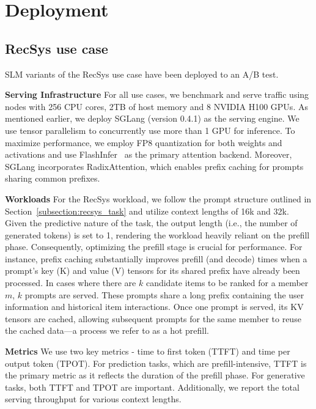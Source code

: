 \section{Deployment}
\label{section:deployment}

\subsection{RecSys use case}\label{section:recsys-deploy}
SLM variants of the RecSys use case have been deployed to an A/B test.

\noindent \textbf{Serving Infrastructure} For all use cases, we benchmark and serve traffic using nodes with 256 CPU cores, 2TB of host memory and 8 NVIDIA H100 GPUs. As mentioned earlier, we deploy SGLang (version 0.4.1) as the serving engine. We use tensor parallelism to concurrently use more than 1 GPU for inference. To maximize performance, we employ FP8 quantization for both weights and activations and use FlashInfer~\cite{ye2025flashinfer} as the primary attention backend. Moreover, SGLang incorporates RadixAttention, which enables prefix caching for prompts sharing common prefixes.

\noindent \textbf{Workloads} For the RecSys workload, we follow the prompt structure outlined in Section~\ref{subsection:recsys_task} and utilize context lengths of 16k and 32k. Given the predictive nature of the task, the output length (i.e., the number of generated tokens) is set to 1, rendering the workload heavily reliant on the prefill phase. Consequently, optimizing the prefill stage is crucial for performance. For instance, prefix caching substantially improves prefill (and decode) times when a prompt’s key (K) and value (V) tensors for its shared prefix have already been processed. In cases where there are $k$ candidate items to be ranked for a member $m$, $k$ prompts are served. These prompts share a long prefix containing the user information and historical item interactions. Once one prompt is served, its KV tensors are cached, allowing subsequent prompts for the same member to reuse the cached data—a process we refer to as a hot prefill.

\noindent \textbf{Metrics} We use two key metrics - time to first token (TTFT) and time per output token (TPOT). For prediction tasks, which are prefill-intensive, TTFT is the primary metric as it reflects the duration of the prefill phase. For generative tasks, both TTFT and TPOT are important. Additionally, we report the total serving throughput for various context lengths.

